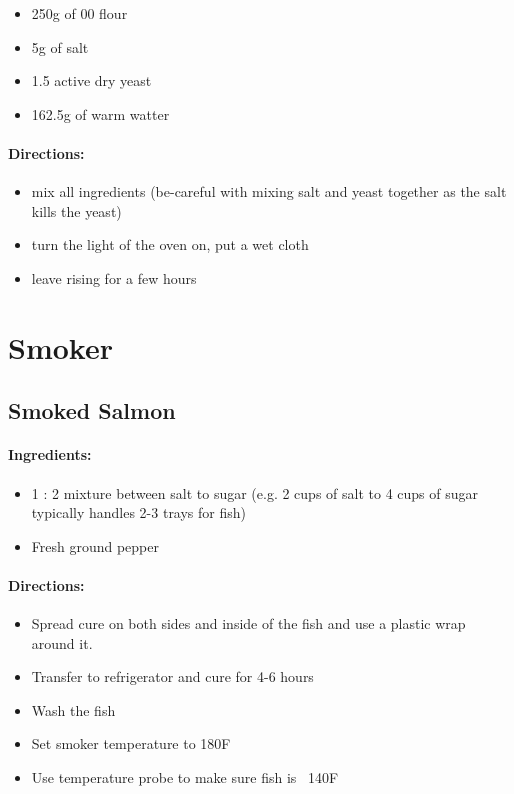 \documentclass{article}
\begin{document}
\begin{itemize}
	\item 250g of 00 flour
	\item 5g of salt
	\item 1.5 active dry yeast
	\item 162.5g of warm watter
\end{itemize}


\paragraph{Directions:}
\begin{itemize}
	\item mix all ingredients (be-careful with mixing salt and yeast together as the salt kills the yeast)
	\item turn the light of the oven on, put a wet cloth
	\item leave rising for a few hours
\end{itemize}

\section{Smoker}

\subsection{Smoked Salmon}{}

\paragraph{Ingredients:}

\begin{itemize}
	\item 1 : 2 mixture between salt to sugar (e.g. 2 cups of salt to 4 cups of sugar typically handles 2-3 trays for fish)
	\item Fresh ground pepper
\end{itemize}

\paragraph{Directions:}
\begin{itemize}
	\item Spread cure on both sides and inside of the fish and use a plastic wrap around it.
	\item Transfer to refrigerator and cure for 4-6 hours
	\item Wash the fish
	\item Set smoker temperature to 180F
	\item Use temperature probe to make sure fish is ~140F
\end{itemize}
\end{document}
